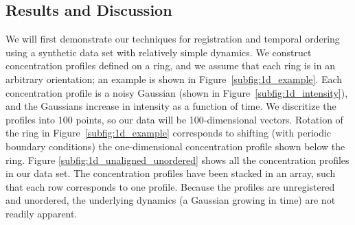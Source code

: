 \documentclass{pnastwo}
\begin{document}
\begin{article}
\section{Results and Discussion}


We will first demonstrate our techniques for registration and temporal ordering using a synthetic data set with relatively simple dynamics.
%
We construct concentration profiles defined on a ring, and we assume that each ring is in an arbitrary orientation; an example is shown in Figure~\ref{subfig:1d_example}.
%
Each concentration profile is a noisy Gaussian (shown in Figure~\ref{subfig:1d_intensity}), and the Gaussians increase in intensity as  a function of time.
%
We discritize the profiles into 100 points, so our data will be 100-dimensional vectors. 
%
Rotation of the ring in Figure~\ref{subfig:1d_example} corresponds to shifting (with periodic boundary conditions) the one-dimensional concentration profile shown below the ring. 
%
Figure \ref{subfig:1d_unaligned_unordered} shows all the concentration profiles in our data set. 
%
The concentration profiles have been stacked in an array, such that each row corresponds to one profile.
%
Because the profiles are unregistered and unordered, the underlying dynamics (a Gaussian growing in time) are not readily apparent.


\end{article}
\end{document}
